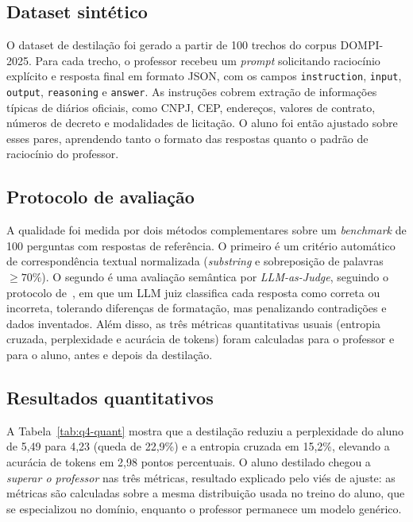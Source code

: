 \subsection{Dataset sintético}

O dataset de destilação foi gerado a partir de 100 trechos do corpus DOMPI-2025.
Para cada trecho, o professor recebeu um \textit{prompt} solicitando raciocínio
explícito e resposta final em formato JSON, com os campos \texttt{instruction},
\texttt{input}, \texttt{output}, \texttt{reasoning} e \texttt{answer}. As instruções
cobrem extração de informações típicas de diários oficiais, como CNPJ, CEP,
endereços, valores de contrato, números de decreto e modalidades de licitação. O
aluno foi então ajustado sobre esses pares, aprendendo tanto o formato das respostas
quanto o padrão de raciocínio do professor.

\subsection{Protocolo de avaliação}

A qualidade foi medida por dois métodos complementares sobre um \textit{benchmark} de
100 perguntas com respostas de referência. O primeiro é um critério automático de
correspondência textual normalizada (\textit{substring} e sobreposição de palavras
$\geq 70\%$). O segundo é uma avaliação semântica por \textit{LLM-as-Judge}, seguindo
o protocolo de~\cite{zheng2023judging}, em que um LLM juiz classifica cada resposta
como correta ou incorreta, tolerando diferenças de formatação, mas penalizando
contradições e dados inventados. Além disso, as três métricas quantitativas usuais
(entropia cruzada, perplexidade e acurácia de tokens) foram calculadas para o
professor e para o aluno, antes e depois da destilação.

\subsection{Resultados quantitativos}

A Tabela~\ref{tab:q4-quant} mostra que a destilação reduziu a perplexidade do aluno
de 5,49 para 4,23 (queda de 22,9\%) e a entropia cruzada em 15,2\%, elevando a
acurácia de tokens em 2,98 pontos percentuais. O aluno destilado chegou a
\emph{superar o professor} nas três métricas, resultado explicado pelo viés de
ajuste: as métricas são calculadas sobre a mesma distribuição usada no treino do
aluno, que se especializou no domínio, enquanto o professor permanece um modelo
genérico.

